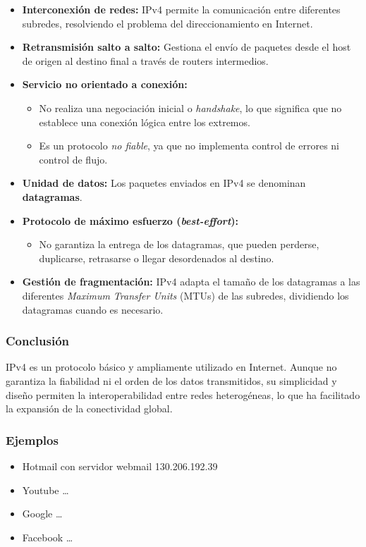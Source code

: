 \documentclass[a4paper,12pt]{article}
\begin{document}
\begin{itemize}
    \item \textbf{Interconexión de redes:} IPv4 permite la comunicación entre diferentes subredes, resolviendo el problema del direccionamiento en Internet.
    \item \textbf{Retransmisión salto a salto:} Gestiona el envío de paquetes desde el host de origen al destino final a través de routers intermedios.
    \item \textbf{Servicio no orientado a conexión:}
    \begin{itemize}
        \item No realiza una negociación inicial o \textit{handshake}, lo que significa que no establece una conexión lógica entre los extremos.
        \item Es un protocolo \textit{no fiable}, ya que no implementa control de errores ni control de flujo.
    \end{itemize}
    \item \textbf{Unidad de datos:} Los paquetes enviados en IPv4 se denominan \textbf{datagramas}.
    \item \textbf{Protocolo de máximo esfuerzo (\textit{best-effort}):}
    \begin{itemize}
        \item No garantiza la entrega de los datagramas, que pueden perderse, duplicarse, retrasarse o llegar desordenados al destino.
    \end{itemize}
    \item \textbf{Gestión de fragmentación:} IPv4 adapta el tamaño de los datagramas a las diferentes \textit{Maximum Transfer Units} (MTUs) de las subredes, dividiendo los datagramas cuando es necesario.
\end{itemize}

\subsubsection*{Conclusión}

IPv4 es un protocolo básico y ampliamente utilizado en Internet. Aunque no garantiza la fiabilidad ni el orden de los datos transmitidos, su simplicidad y diseño permiten la interoperabilidad entre redes heterogéneas, lo que ha facilitado la expansión de la conectividad global.

\subsubsection*{Ejemplos}
\begin{itemize}
    \item Hotmail con servidor webmail 130.206.192.39
    \item Youtube \dots
    \item Google \dots
    \item Facebook \dots
\end{itemize}
\end{document}
